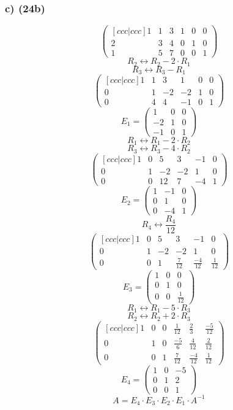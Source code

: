 \documentclass[lineaire_algebra_oplossingen.tex]{subfiles}
\begin{document}
\subsubsection*{c) (24b)}
\[
\begin{pmatrix}[ccc|ccc]
1 & 1 & 3 & 1 & 0 & 0\\
2 & 3 & 4 & 0 & 1 & 0\\
1 & 5 & 7 & 0 & 0 & 1
\end{pmatrix}
\]
\[ R_2 \leftrightarrow R_2 - 2 \cdot R_1 \]
\[ R_3 \leftrightarrow R_3 - R_1 \]
\[ 
\begin{pmatrix}[ccc|ccc]
1 & 1 & 3 & 1 & 0 & 0\\
0 & 1 & -2 & -2 & 1 & 0\\
0 & 4 & 4  & -1 & 0 & 1
\end{pmatrix}
\]
\[E_1 =
\begin{pmatrix}
1 & 0 & 0\\
-2 & 1 & 0\\
-1 & 0 & 1
\end{pmatrix}
\]
\[ R_1 \leftrightarrow R_1 - 2 \cdot R_2 \]
\[ R_3 \leftrightarrow R_3 - 4 \cdot R_2 \]
\[ 
\begin{pmatrix}[ccc|ccc]
1 & 0 & 5 & 3 & -1 & 0\\
0 & 1 & -2 & -2 & 1 & 0\\
0 & 0 & 12 & 7 & -4 & 1
\end{pmatrix}
\]
\[E_2 =
\begin{pmatrix}
1 & -1 & 0\\
0 & 1 & 0\\
0 & -4 & 1
\end{pmatrix}
\]
\[ R_4 \leftrightarrow\frac{R_4}{12} \]
\[ 
\begin{pmatrix}[ccc|ccc]
1 & 0 & 5 & 3 & -1 & 0\\
0 & 1 & -2 & -2 & 1 & 0\\
0 & 0 & 1 & \frac{7}{12} & \frac{-4}{12} & \frac{1}{12}
\end{pmatrix}
\]
\[ E_3 =
\begin{pmatrix}
1 & 0 & 0\\
0 & 1 & 0\\
0 & 0 & \frac{1}{12}
\end{pmatrix}
\]
\[ R_1 \leftrightarrow R_1 - 5 \cdot R_3 \]
\[ R_2 \leftrightarrow R_2 + 2 \cdot R_3 \]
\[ 
\begin{pmatrix}[ccc|ccc]
1 & 0 & 0 & \frac{1}{12} & \frac{2}{3} & \frac{-5}{12}\\
0 & 1 & 0 & \frac{-5}{6} & \frac{4}{12} & \frac{2}{12}\\
0 & 0 & 1 & \frac{7}{12} & \frac{-4}{12} & \frac{1}{12}
\end{pmatrix}
\]
\[ E_4 =
\begin{pmatrix}
1 & 0 & -5\\
0 & 1 & 2\\
0 & 0 & 1
\end{pmatrix}
\]
\[ A = E_4 \cdot E_3 \cdot E_2 \cdot E_1 \cdot A^{-1} \]
\end{document}
